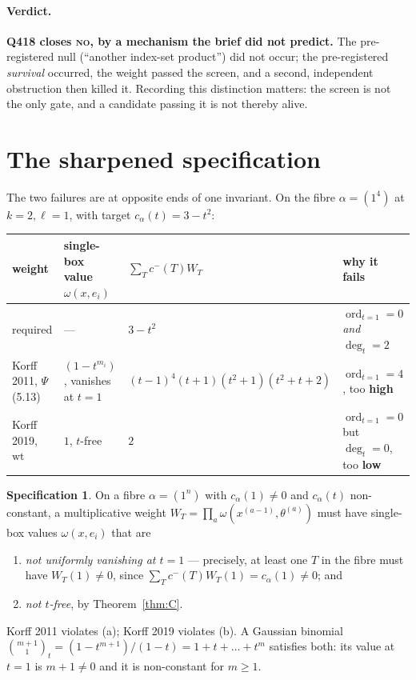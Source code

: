 \documentclass[11pt]{article}
\theoremstyle{definition}
\newtheorem{spec}[theorem]{Specification}
\DeclareMathOperator{\ord}{ord}
\begin{document}
\paragraph{Verdict.} \textbf{Q418 closes \textsc{no}, by a mechanism the brief did not
predict.}  The pre-registered null (``another index-set product'') did not occur; the
pre-registered \emph{survival} occurred, the weight passed the screen, and a second,
independent obstruction then killed it.  Recording this distinction matters: the screen
is not the only gate, and a candidate passing it is not thereby alive.

\section{The sharpened specification}

The two failures are at opposite ends of one invariant.  On the fibre
$\alpha=(1^4)$ at $k=2,\ell=1$, with target $c_\alpha(t)=3-t^2$:
\begin{center}\small
\begin{tabular}{@{}llll@{}}
\toprule
weight & single-box value $\omega(x,e_i)$ & $\sum_T c^-(T)W_T$ & why it fails \\
\midrule
required & --- & $3-t^2$ & $\ord_{t=1}=0$ \emph{and} $\deg_t=2$\\
Korff 2011, $\Psi$ (5.13) & $(1-t^{m_i})$, vanishes at $t=1$ &
  $(t-1)^4(t+1)(t^2+1)(t^2+t+2)$ & $\ord_{t=1}=4$, too \textbf{high}\\
Korff 2019, $\mathrm{wt}$ & $1$, $t$-free &
  $2$ & $\ord_{t=1}=0$ but $\deg_t=0$, too \textbf{low}\\
\bottomrule
\end{tabular}
\end{center}

\begin{spec}\label{spec}
On a fibre $\alpha=(1^n)$ with $c_\alpha(1)\ne0$ and $c_\alpha(t)$ non-constant, a
multiplicative weight $W_T=\prod_a\omega(x^{(a-1)},\theta^{(a)})$ must have single-box
values $\omega(x,e_i)$ that are
\begin{enumerate}
\item[\textup{(a)}] \emph{not uniformly vanishing at $t=1$} --- precisely, at least one
  $T$ in the fibre must have $W_T(1)\ne0$, since $\sum_Tc^-(T)W_T(1)=c_\alpha(1)\ne0$;
  and
\item[\textup{(b)}] \emph{not $t$-free}, by Theorem~\ref{thm:C}.
\end{enumerate}
Korff 2011 violates (a); Korff 2019 violates (b).  A Gaussian binomial
$\binom{m+1}{1}_t=(1-t^{m+1})/(1-t)=1+t+\dots+t^{m}$ satisfies both: its value at
$t=1$ is $m+1\ne0$ and it is non-constant for $m\ge1$.
\end{spec}
\end{document}
